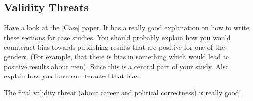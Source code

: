 \documentclass[times, 10pt,twocolumn]{article}
\begin{document}
\subsection{Validity Threats}
Have a look at the [Case] paper. It has a really good explanation on how to write these sections for case studies. You should probably explain how you would counteract bias towards publishing results that are positive for one of the genders. (For example, that there is bias in something which would lead to positive results about men). Since this is a central part of your study. Also explain how you have counteracted that bias. 

The final validity threat (about career and political correctness) is really good!
\end{document}
